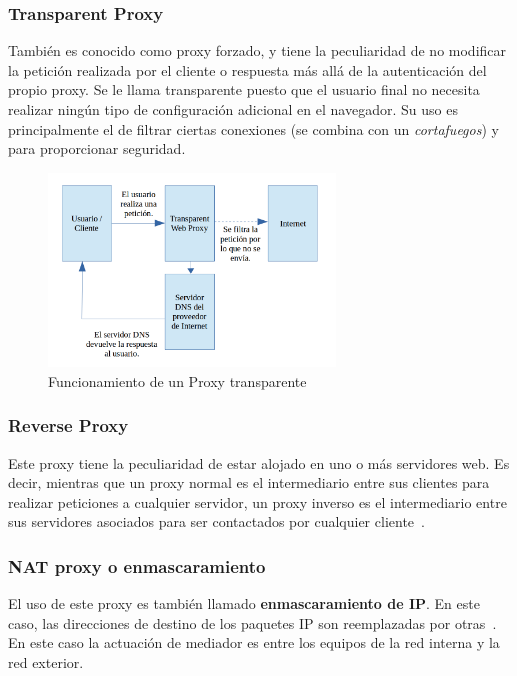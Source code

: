 \subsubsection{Transparent Proxy}

También es conocido como proxy forzado, y tiene la peculiaridad de no modificar la petición realizada por el cliente o respuesta más allá de la autenticación del propio proxy.
Se le llama transparente puesto que el usuario final no necesita realizar ningún tipo de configuración adicional en el navegador.
Su uso es principalmente el de filtrar ciertas conexiones (se combina con un \textit{cortafuegos}) y para proporcionar seguridad.

\begin{figure}[h]
	\centerline{
		\mbox{\includegraphics[width=3.00in]{images/proxy_transparent.png}}
	}
	\caption{Funcionamiento de un Proxy transparente~\cite{article:proxy_trans}}
	\label{fig:trans_proxy}
\end{figure}

\subsubsection{Reverse Proxy}

Este proxy tiene la peculiaridad de estar alojado en uno o más servidores web.
Es decir, mientras que un proxy normal es el intermediario entre sus clientes para realizar peticiones a cualquier servidor, un proxy inverso es el intermediario entre sus servidores asociados para ser contactados por cualquier cliente~\cite{article:proxy_rev}.

\subsubsection{NAT proxy o enmascaramiento}

El uso de este proxy es también llamado \textbf{enmascaramiento de IP}. En este caso, las direcciones de destino de los paquetes IP son reemplazadas por otras~\cite{article:nat}.
En este caso la actuación de mediador es entre los equipos de la red interna y la red exterior.\\

